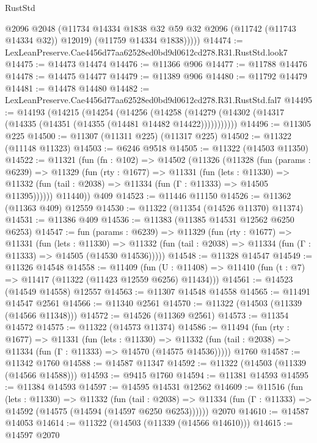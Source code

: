 \begin{lexlean}{RustStd}
\begin{coremodule}
            @2096
            @2048
            (@11734 @14334 @1838 @32 @59 @32 @2096 (@11742 (@11743 @14334 @32)) @12019)
            (@11759 @14334 @1838)))))
@14474 := LexLeanPreserve.Cae4456d77aa62528ed0bd9d0612cd278.R31.RustStd.look7
@14475 := @14473 @14474
@14476 := @11366 @906
@14477 := @11788 @14476
@14478 := @14475 @14477
@14479 := @11389 @906
@14480 := @11792 @14479
@14481 := @14478 @14480
@14482 := LexLeanPreserve.Cae4456d77aa62528ed0bd9d0612cd278.R31.RustStd.fal7
@14495 := @14193
    (@14215
      (@14254
        (@14256
          (@14258 (@14279 (@14302 (@14317 (@14335 (@14351 (@14355 (@14481 @14482 @14422)))))))))))
@14496 := @11305 @225
@14500 := @11307 (@11311 @225) (@11317 @225)
@14502 := @11322 (@11148 @11323)
@14503 := @6246 @9518
@14505 := @11322 (@14503 @11350)
@14522 := @11321
    (fun (fn : @102) =>
    @14502
      (@11326
        (@11328
          (fun (params : @6239) =>
          @11329
            (fun (rty : @1677) =>
            @11331
              (fun (lets : @11330) =>
              @11332 (fun (tail : @2038) => @11334 (fun (Γ : @11333) => @14505 @11395))))))
        @11440))
    @409
@14523 := @11446 @11150
@14526 := @11362 (@11363 @409) @12559
@14530 := @11322 (@11354 (@14526 @11370) @11374)
@14531 := @11386 @409
@14536 := @11383 (@11385 @14531 @12562 @6250 @6253)
@14547 := fun (params : @6239) =>
  @11329
    (fun (rty : @1677) =>
    @11331
      (fun (lets : @11330) =>
      @11332 (fun (tail : @2038) => @11334 (fun (Γ : @11333) => @14505 (@14530 @14536)))))
@14548 := @11328 @14547
@14549 := @11326 @14548
@14558 := @11409
    (fun (U : @11408) => @11410 (fun (t : @7) => @11417 (@11322 (@11423 @12559 @6256) @11434)))
@14561 := @14523 (@14549 @14558) @12557
@14563 := @11307 @14548 @14558
@14565 := @11491 @14547 @2561
@14566 := @11340 @2561
@14570 := @11322 (@14503 (@11339 (@14566 @11348)))
@14572 := @14526 (@11369 @2561)
@14573 := @11354 @14572
@14575 := @11322 (@14573 @11374)
@14586 := @11494
    (fun (rty : @1677) =>
    @11331
      (fun (lets : @11330) =>
      @11332 (fun (tail : @2038) => @11334 (fun (Γ : @11333) => @14570 (@14575 @14536)))))
    @1760
@14587 := @11342 @1760
@14588 := @14587 @11347
@14592 := @11322 (@14503 (@11339 (@14566 @14588)))
@14593 := @9415 @1760
@14594 := @11381 @14593
@14595 := @11384 @14593
@14597 := @14595 @14531 @12562
@14609 := @11516
    (fun (lets : @11330) =>
    @11332
      (fun (tail : @2038) =>
      @11334 (fun (Γ : @11333) => @14592 (@14575 (@14594 (@14597 @6250 @6253))))))
    @2070
@14610 := @14587 @14053
@14614 := @11322 (@14503 (@11339 (@14566 @14610)))
@14615 := @14597 @2070

\end{coremodule}
\end{lexlean}

